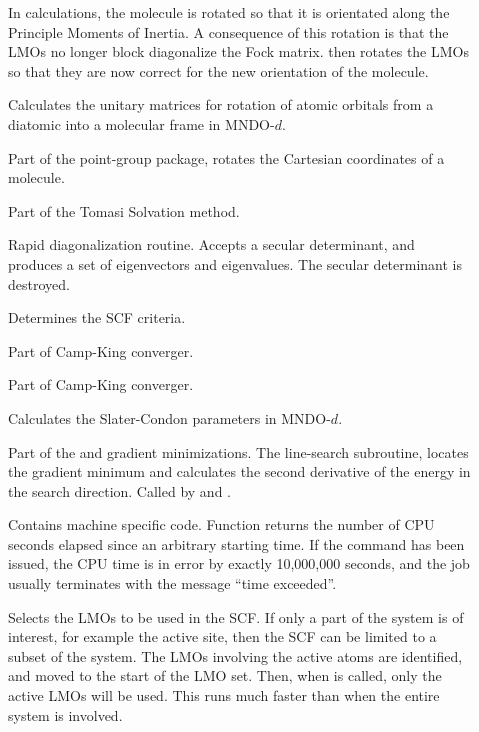 \begin{description}
\item[] In  calculations, the molecule is
rotated so that it is orientated along the Principle Moments of Inertia.  A
consequence of this rotation is that the LMOs no longer block diagonalize the
Fock matrix.  then rotates the LMOs so that they are now correct
for the new orientation of the molecule.

\item[] Calculates the unitary matrices for rotation of atomic
orbitals from a diatomic into a molecular frame in MNDO-$d$.

\item[] Part of the point-group package,  rotates the
Cartesian coordinates of a molecule. \item[] Part of the Tomasi
Solvation method.

\item[] Rapid diagonalization routine. Accepts a secular determinant,
and produces a set of eigenvectors and  eigenvalues. The secular determinant is
destroyed. 

\item[] Determines the SCF criteria.

\item[] Part of Camp-King converger.

\item[] Part of Camp-King converger.

\item[] Calculates the Slater-Condon parameters in MNDO-$d$.

\item[] Part of the  and   gradient
minimizations.  The line-search subroutine,  locates the gradient 
minimum and calculates the second derivative of the energy  in the search
direction. Called by  and .

\item[] Contains machine specific code. Function 
returns the number of CPU seconds elapsed since an arbitrary  starting time. If
the  command has been issued,  the CPU time is in error by exactly
10,000,000 seconds, and  the job usually terminates with the message ``time
exceeded''.

\item[] Selects the LMOs to be used in the SCF.  If only a part of
the system is of interest, for example the active site, then the SCF can be
limited to a subset of the system.  The LMOs involving the active atoms are
identified, and moved to the start of the LMO set.  Then, when  is
called, only the active LMOs will be used.  This runs much faster than when the
entire system is involved.


\end{description}
